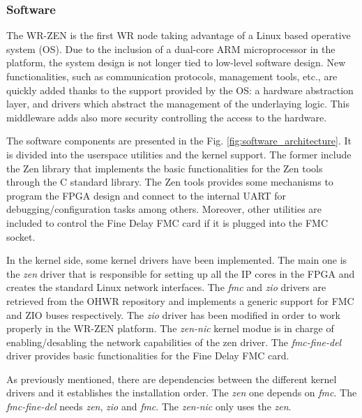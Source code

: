 \subsubsection{Software} \label{subsec:software}

The WR-ZEN is the first WR node taking advantage of a Linux 
based operative system (OS). Due to the inclusion of a dual-core ARM 
microprocessor in the platform, the system design is not longer tied to 
low-level software design. New functionalities, such as communication 
protocols, management tools, etc., are quickly added thanks to the support 
provided by the OS: a hardware abstraction layer, and drivers which abstract 
the management of the underlaying logic. This middleware adds also more 
security controlling the access to the hardware.

The software components are presented in the Fig. \ref{fig:software_architecture}.
It is divided into the userspace utilities and the kernel support. 
The former include the Zen library that implements the basic functionalities for the Zen tools through the C standard library. The Zen tools provides some mechanisms to program the FPGA
design and connect to the internal UART for debugging/configuration tasks among others. 
Moreover, other utilities are included to control the Fine Delay FMC card if it is plugged into the FMC socket.

In the kernel side, some kernel drivers have been implemented. The main one is the \textit{zen}
driver that is responsible for setting up all the IP cores in the FPGA and creates the 
standard Linux network interfaces. The \textit{fmc} and \textit{zio} drivers are retrieved from the 
OHWR repository and implements a generic support for FMC and ZIO buses respectively. 
The \textit{zio} driver has been modified in order to work properly in the WR-ZEN platform.
The \textit{zen-nic} kernel modue is in charge of enabling/desabling the network capabilities of 
the zen driver. The \textit{fmc-fine-del} driver provides basic functionalities for the Fine Delay FMC card.

As previously mentioned, there are dependencies between the different kernel drivers and it establishes the installation order. The \textit{zen} one depends on \textit{fmc}. The \textit{fmc-fine-del} needs \textit{zen}, \textit{zio} and \textit{fmc}. The \textit{zen-nic} only uses the \textit{zen}.

